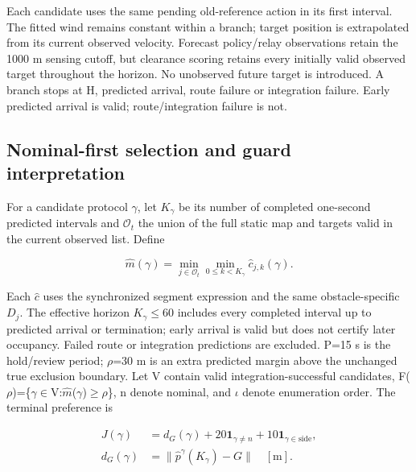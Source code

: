 \documentclass[conference]{IEEEtran}
\begin{document}
Each candidate uses the same pending old-reference action in its first interval. The fitted wind remains constant within a branch; target position is extrapolated from its current observed velocity. Forecast policy/relay observations retain the 1000 m sensing cutoff, but clearance scoring retains every initially valid observed target throughout the horizon. No unobserved future target is introduced. A branch stops at H, predicted arrival, route failure or integration failure. Early predicted arrival is valid; route/integration failure is not.

\subsection{Nominal-first selection and guard interpretation}

For a candidate protocol \ensuremath{\gamma}, let $K_\gamma$ be its number of completed one-second predicted intervals and $\mathcal O_t$ the union of the full static map and targets valid in the current observed list. Define

\begin{equation}\label{eq:3}
\hat m(\gamma)=\min_{j\in\mathcal O_t}\min_{0\le k<K_\gamma}\hat c_{j,k}(\gamma).
\end{equation}

Each $\hat c$ uses the synchronized segment expression and the same obstacle-specific $D_j$. The effective horizon $K_\gamma$\ensuremath{\le}60 includes every completed interval up to predicted arrival or termination; early arrival is valid but does not certify later occupancy. Failed route or integration predictions are excluded. P=15 s is the hold/review period; \ensuremath{\rho}=30 m is an extra predicted margin above the unchanged true exclusion boundary. Let V contain valid integration-successful candidates, F(\ensuremath{\rho})=\{\ensuremath{\gamma}\ensuremath{\in}V:$\hat m$(\ensuremath{\gamma})\ensuremath{\ge}\ensuremath{\rho}\}, n denote nominal, and \ensuremath{\iota} denote enumeration order. The terminal preference is

\begin{equation}\label{eq:4}
\begin{aligned}J(\gamma)&=d_G(\gamma)+20\mathbf{1}_{\gamma\ne n}+10\mathbf{1}_{\gamma\in\mathrm{side}},\\d_G(\gamma)&=\|\hat p^\gamma(K_\gamma)-G\|\quad[\mathrm m].\end{aligned}
\end{equation}
\end{document}
